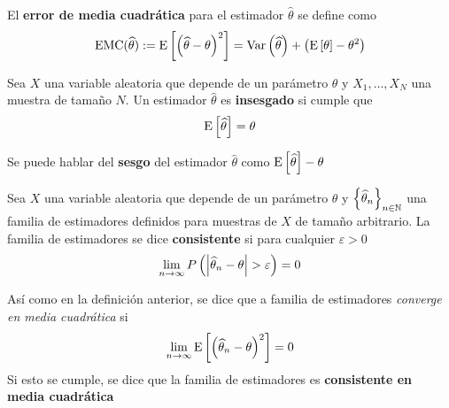 
\begin{definicion}
El \textbf{error de media cuadrática} para el estimador $\widehat{\theta}$ se define como
\begin{equation}
\text{EMC}(\widehat{\theta}) := \mathrm{E}\left[ \left( \widehat{\theta} - \theta \right)^{2} \right] =
\mathrm{Var}\left( \widehat{\theta} \right) + \left( \mathrm{E}\left[ \theta \right] - \theta^{2} \right)
\end{equation}
\end{definicion}

\begin{definicion}
Sea $X$ una variable aleatoria que depende de un parámetro $\theta$ y $X_1, \dots, X_N$ una muestra de tamaño $N$. Un estimador $\widehat{\theta}$ es \textbf{insesgado} si cumple que
\begin{equation}
\mathrm{E}\left[ \widehat{\theta} \right] = \theta
\end{equation}
\end{definicion}

Se puede hablar del \textbf{sesgo} del estimador $\widehat{\theta}$ como $\mathrm{E}\left[ \widehat{\theta} \right]-\theta$

\begin{definicion}
Sea $X$ una variable aleatoria que depende de un parámetro $\theta$ y $\left\{ \widehat{\theta}_n \right\}_{n\in \mathbb{N}}$ una familia de estimadores definidos para muestras de $X$ de tamaño arbitrario. La familia de estimadores se dice \textbf{consistente} si para cualquier $\varepsilon > 0$
\begin{equation}
\lim_{n\rightarrow\infty} P\left( \left| \widehat{\theta}_n-\theta \right| > \varepsilon \right) = 0
\end{equation}
\end{definicion}

\begin{definicion}
Así como en la definición anterior, se dice que a familia de estimadores \textit{converge en media cuadrática} si
\begin{equation}
\lim_{n\rightarrow\infty} \mathrm{E}\left[ \left( \widehat{\theta}_n - \theta \right)^{2} \right] = 0
\end{equation}
Si esto se cumple, se dice que la familia de estimadores es \textbf{consistente en media cuadrática} \end{definicion}


